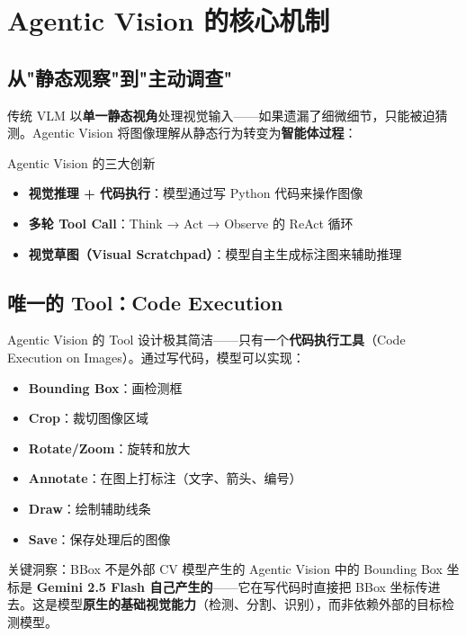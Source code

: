 \documentclass[a4paper]{article}
\begin{document}
\section{Agentic Vision 的核心机制}

\subsection{从"静态观察"到"主动调查"}

传统 VLM 以\textbf{单一静态视角}处理视觉输入——如果遗漏了细微细节，只能被迫猜测。Agentic Vision 将图像理解从静态行为转变为\textbf{智能体过程}：

\begin{importantbox}{Agentic Vision 的三大创新}
\begin{itemize}
    \item \textbf{视觉推理 + 代码执行}：模型通过写 Python 代码来操作图像
    \item \textbf{多轮 Tool Call}：Think → Act → Observe 的 ReAct 循环
    \item \textbf{视觉草图（Visual Scratchpad）}：模型自主生成标注图来辅助推理
\end{itemize}
\end{importantbox}

\subsection{唯一的 Tool：Code Execution}

Agentic Vision 的 Tool 设计极其简洁——只有一个\textbf{代码执行工具}（Code Execution on Images）。通过写代码，模型可以实现：

\begin{itemize}
    \item \textbf{Bounding Box}：画检测框
    \item \textbf{Crop}：裁切图像区域
    \item \textbf{Rotate/Zoom}：旋转和放大
    \item \textbf{Annotate}：在图上打标注（文字、箭头、编号）
    \item \textbf{Draw}：绘制辅助线条
    \item \textbf{Save}：保存处理后的图像
\end{itemize}

\begin{warningbox}{关键洞察：BBox 不是外部 CV 模型产生的}
Agentic Vision 中的 Bounding Box 坐标是 \textbf{Gemini 2.5 Flash 自己产生的}——它在写代码时直接把 BBox 坐标传进去。这是模型\textbf{原生的基础视觉能力}（检测、分割、识别），而非依赖外部的目标检测模型。
\end{warningbox}
\end{document}
